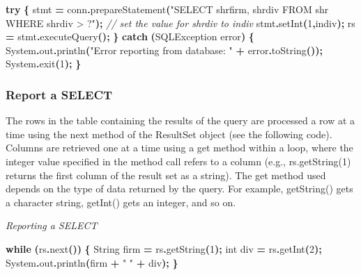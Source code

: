 \documentclass[
]{article}
\newenvironment{Shaded}{\begin{snugshade}}{\end{snugshade}}
\newcommand{\BuiltInTok}[1]{#1}
\newcommand{\CommentTok}[1]{\textcolor[rgb]{0.56,0.35,0.01}{\textit{#1}}}
\newcommand{\ControlFlowTok}[1]{\textcolor[rgb]{0.13,0.29,0.53}{\textbf{#1}}}
\newcommand{\DataTypeTok}[1]{\textcolor[rgb]{0.13,0.29,0.53}{#1}}
\newcommand{\DecValTok}[1]{\textcolor[rgb]{0.00,0.00,0.81}{#1}}
\newcommand{\FunctionTok}[1]{\textcolor[rgb]{0.00,0.00,0.00}{#1}}
\newcommand{\NormalTok}[1]{#1}
\newcommand{\OperatorTok}[1]{\textcolor[rgb]{0.81,0.36,0.00}{\textbf{#1}}}
\newcommand{\StringTok}[1]{\textcolor[rgb]{0.31,0.60,0.02}{#1}}
\begin{document}
\begin{Shaded}
\begin{Highlighting}[]
\ControlFlowTok{try} \OperatorTok{\{}
\NormalTok{    stmt }\OperatorTok{=}\NormalTok{ conn}\OperatorTok{.}\FunctionTok{prepareStatement}\OperatorTok{(}\StringTok{"SELECT shrfirm, shrdiv FROM shr WHERE shrdiv \textgreater{} ?"}\OperatorTok{);}
    \CommentTok{// set the value for shrdiv to indiv}
\NormalTok{    stmt}\OperatorTok{.}\FunctionTok{setInt}\OperatorTok{(}\DecValTok{1}\OperatorTok{,}\NormalTok{indiv}\OperatorTok{);}
\NormalTok{    rs }\OperatorTok{=}\NormalTok{ stmt}\OperatorTok{.}\FunctionTok{executeQuery}\OperatorTok{();}
    \OperatorTok{\}}
\ControlFlowTok{catch} \OperatorTok{(}\BuiltInTok{SQLException}\NormalTok{ error}\OperatorTok{)}
    \OperatorTok{\{}
        \BuiltInTok{System}\OperatorTok{.}\FunctionTok{out}\OperatorTok{.}\FunctionTok{println}\OperatorTok{(}\StringTok{"Error reporting from database: "}
            \OperatorTok{+}\NormalTok{ error}\OperatorTok{.}\FunctionTok{toString}\OperatorTok{());}
        \BuiltInTok{System}\OperatorTok{.}\FunctionTok{exit}\OperatorTok{(}\DecValTok{1}\OperatorTok{);}
    \OperatorTok{\}}
\end{Highlighting}
\end{Shaded}

\hypertarget{report-a-select}{%
\subsubsection*{Report a SELECT}\label{report-a-select}}

The rows in the table containing the results of the query are processed
a row at a time using the next method of the ResultSet object (see the
following code). Columns are retrieved one at a time using a get method
within a loop, where the integer value specified in the method call
refers to a column (e.g., rs.getString(1) returns the first column of
the result set as a string). The get method used depends on the type of
data returned by the query. For example, getString() gets a character
string, getInt() gets an integer, and so on.

\emph{Reporting a SELECT}

\begin{Shaded}
\begin{Highlighting}[]
\ControlFlowTok{while} \OperatorTok{(}\NormalTok{rs}\OperatorTok{.}\FunctionTok{next}\OperatorTok{())} \OperatorTok{\{}
    \BuiltInTok{String}\NormalTok{ firm }\OperatorTok{=}\NormalTok{ rs}\OperatorTok{.}\FunctionTok{getString}\OperatorTok{(}\DecValTok{1}\OperatorTok{);}
    \DataTypeTok{int}\NormalTok{ div }\OperatorTok{=}\NormalTok{ rs}\OperatorTok{.}\FunctionTok{getInt}\OperatorTok{(}\DecValTok{2}\OperatorTok{);}
    \BuiltInTok{System}\OperatorTok{.}\FunctionTok{out}\OperatorTok{.}\FunctionTok{println}\OperatorTok{(}\NormalTok{firm }\OperatorTok{+} \StringTok{" "} \OperatorTok{+}\NormalTok{ div}\OperatorTok{);}
\OperatorTok{\}}
\end{Highlighting}
\end{Shaded}
\end{document}
